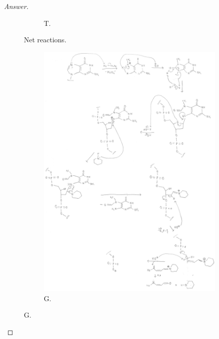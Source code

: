 \documentclass[../psets.tex]{subfiles}
\begin{document}
\begin{enumerate}
\begin{proof}[Answer]
\begin{figure}[H]
\begin{subfigure}[b]{\linewidth}
                \caption{T.}
                \label{fig:pset3-netRxnT}
            \end{subfigure}
            \caption{Net reactions.}
            \label{fig:pset3-netRxn}
        \end{figure}
        \begin{figure}[H]
            \centering
            \begin{subfigure}[b]{\linewidth}
                \centering
                \includegraphics[width=\linewidth]{../ExtFiles/pset3-mechanismG.png}
                \caption{G.}
                \label{fig:pset3-mechanismG}
            \end{subfigure}
        \end{figure}
        \begin{figure}[H]
            \ContinuedFloat
            \centering
            \begin{subfigure}[b]{\linewidth}

\end{subfigure}
\end{figure}
\end{proof}
\end{enumerate}
\end{document}
